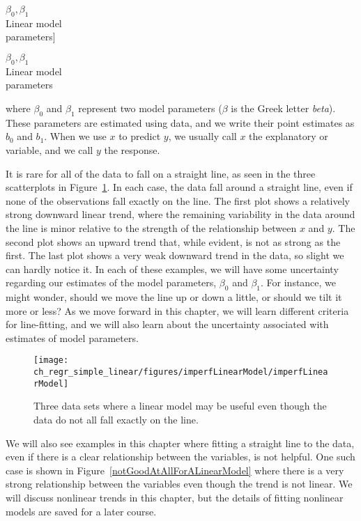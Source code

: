 $\beta_0, \beta_1$\vspace{0.7mm}\\\footnotesize Linear model\\ parameters]{\raggedright\vspace{-10mm}

$\beta_0, \beta_1$\vspace{0.7mm}\\\footnotesize Linear model\\ parameters}where $\beta_0$ and $\beta_1$ represent two model parameters ($\beta$ is the Greek letter \emph{beta}). These parameters are estimated using data, and we write their point estimates as $b_0$ and $b_1$. When we use $x$ to predict $y$, we usually call $x$ the explanatory or  variable, and we call $y$ the response.

It is rare for all of the data to fall on a straight line, as seen in the three scatterplots in Figure~\ref{imperfLinearModel}. In each case, the data fall around a straight line, even if none of the observations fall exactly on the line. The first plot shows a relatively strong downward linear trend, where the remaining variability in the data around the line is minor relative to the strength of the relationship between $x$ and $y$. The second plot shows an upward trend that, while evident, is not as strong as the first. The last plot shows a very weak downward trend in the data, so slight we can hardly notice it. In each of these examples, we will have some uncertainty regarding our estimates of the model parameters, $\beta_0$ and $\beta_1$. For instance, we might wonder, should we move the line up or down a little, or should we tilt it more or less? As we move forward in this chapter, we will learn different criteria for line-fitting, and we will also learn about the uncertainty associated with estimates of model parameters.

\begin{figure}
   \centering
   \texttt{[image: ch\_regr\_simple\_linear/figures/imperfLinearModel/imperfLinearModel]}
   \caption{Three data sets where a linear model may be useful even though the data do not all fall exactly on the line.}
   \label{imperfLinearModel}
\end{figure}

We will also see examples in this chapter where fitting a straight line to the data, even if there is a clear relationship between the variables, is not helpful. One such case is shown in Figure~\ref{notGoodAtAllForALinearModel} where there is a very strong relationship between the variables even though the trend is not linear. We will discuss nonlinear trends in this chapter, but the details of fitting nonlinear models are saved for a later course.

